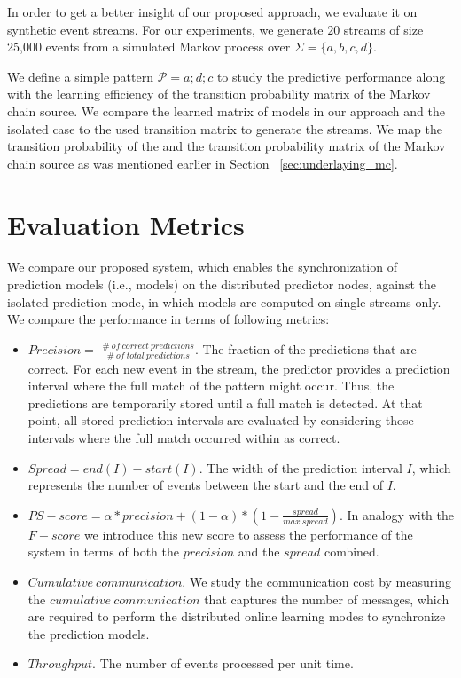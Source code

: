 \par In order to get a better insight of our proposed approach, we evaluate it on synthetic event streams. For our experiments, we generate $20$ streams of size 25,000 events from a simulated Markov process over $\Sigma=\{a, b, c, d\}$.

\par We define a simple pattern $\mathcal{P}=a ; d ; c$ to study the predictive performance along with the learning efficiency of the transition probability matrix of the Markov chain source.  We compare the learned matrix of \pmcmr models in our approach and the isolated case to the used transition matrix to generate the streams. We map the transition probability of the \pmcmr and the transition probability matrix of the Markov chain source as was mentioned earlier in Section ~\ref{sec:underlaying_mc}.
   


\section{Evaluation Metrics} 
\label{sec:metrics}
\par We compare our proposed system, which enables the synchronization of prediction models (i.e., \pmcmr models) on the distributed predictor nodes,  against the isolated prediction mode, in which models are computed on single streams only. We compare the performance in terms of following metrics:
\begin{itemize}	
	\item  $\mathit{Precision} =$ $ \mathit{\frac{\#\ of\ correct\ predictions}{\#\ of\ total\ predictions}}$. The fraction of the predictions that are correct. For each new event in the stream, the predictor provides a prediction interval where the full match of the pattern might occur. Thus, the predictions are temporarily stored until a full match is detected. At that point, all stored prediction intervals are evaluated by considering those intervals where the full match occurred within as correct.     
	\item $\mathit{Spread}$$ =end(I) -start(I)$. The width of the prediction interval $I$, which represents the number of events between the start and the end of $I$. 	
	\item $\mathit{PS-score} = \alpha * precision + (1 - \alpha ) * ( 1- \frac{spread}{max\  spread})$. In analogy with the $F-score$ we introduce this new score to assess the performance of the system in terms of both the $\mathit{precision}$ and the $\mathit{spread}$ combined.
	\item  $\mathit{Cumulative\ communication}$. We study the communication cost by measuring the $\mathit{cumulative\ communication}$ that captures the number of messages, which are required to perform the distributed online learning modes to synchronize the prediction models.	
\item $Throughput$. The number of events processed per unit time.
\end{itemize} 

